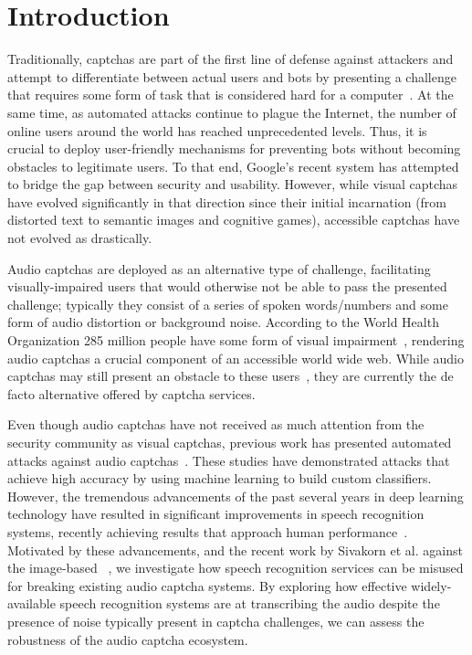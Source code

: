 \section{Introduction}
\label{sec:intro}

Traditionally, captchas are part of the first line of defense against attackers 
and attempt to differentiate between actual users and bots by presenting a challenge 
that requires some form of task that is considered hard for a computer~\cite{captcha}.
At the same time, as automated attacks continue to plague the Internet,
the number of online users around the world has reached unprecedented levels.
Thus, it is crucial to deploy user-friendly mechanisms for preventing bots without
becoming obstacles to legitimate users. To that end, Google's recent \re system
has attempted to bridge the gap between security and usability. %
However, while visual captchas have evolved significantly in that direction
since their initial incarnation (from distorted text to semantic images and cognitive games),
accessible captchas have not evolved as drastically.

Audio captchas are deployed as an alternative type of challenge, facilitating 
visually-impaired users that would otherwise not be able to pass the presented
challenge; typically they consist of a series of spoken words/numbers 
and some form of audio distortion or background noise.
According to the World Health Organization 285 million people have 
some form of visual impairment~\cite{impaired}, rendering audio captchas a
crucial component of an accessible world wide web. While audio captchas may still present
an obstacle to these users~\cite{sauer2008towards,bigham2008inspiring,bigham2009evaluating},
they are currently the de facto alternative offered by captcha services.

Even though audio captchas have not received as much attention from the security community as visual captchas,
previous work has presented automated attacks against audio captchas~\cite{Sano2013,Bursztein2009,
meutzner2014using,tam2009breaking,bursztein2011failure}. These studies have demonstrated attacks
that achieve high accuracy by using machine learning to build custom classifiers.
However, the tremendous advancements of the past several years in deep learning technology have
resulted in significant improvements in speech recognition systems, recently achieving
results that approach human performance~\cite{ibm_blog,saon2017english}. Motivated
by these advancements, and the recent work by Sivakorn et al. against the image-based
\re~\cite{sivakorn:eurosp16}, we investigate how speech recognition services
can be misused for breaking existing audio captcha systems. By exploring how effective
widely-available speech recognition systems are at transcribing the audio despite 
the presence of noise typically present in captcha challenges, we can assess the robustness 
of the audio captcha ecosystem.

